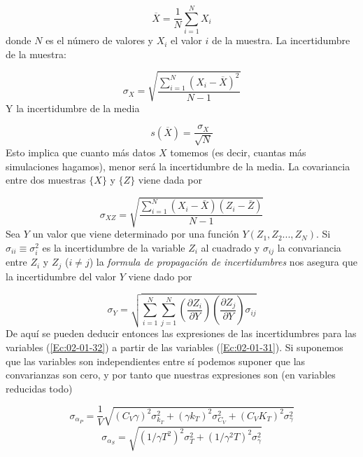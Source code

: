 \documentclass[11pt]{article} %
\newcommand{\parentesis}[1]{\left( #1  \right)}
\newcommand{\parciales}[2]{\frac{\partial #1}{\partial #2}}
\begin{document}
\begin{equation}
	 \overline{X} = \frac{1}{N}\sum_{i=1}^{N} X_i
\end{equation}
donde $N$ es el número de valores y $X_i$ el valor $i$ de la muestra. La incertidumbre de la muestra:

\begin{equation}
	\sigma_X = \sqrt{\frac{\sum_{i=1}^{N} \parentesis{X_i-\overline{X}}^2 }{N-1}}
\end{equation}
Y la incertidumbre de la media

\begin{equation}
	s(\overline{X}) = \frac{\sigma_X}{\sqrt{N}}
\end{equation}
Esto implica que cuanto más datos $X$ tomemos (es decir, cuantas más simulaciones hagamos), menor será la incertidumbre de la media. La covariancia entre dos muestras $\{ X \}$ y $\{ Z \}$ viene dada por 

\begin{equation}
	\sigma_{XZ} = \sqrt{ \frac{\sum_{i=1}^N (X_i-\bar{X})(Z_i-\bar{Z})}{N-1}}
\end{equation} 
Sea $Y$ un valor que viene determinado por una función $Y(Z_1,Z_2...,Z_N)$. Si $\sigma_{ii} \equiv \sigma_{i}^2$ es la incertidumbre de la variable $Z_i$ al cuadrado y $\sigma_{ij}$ la convariancia entre $Z_i$ y $Z_j$ ($i\neq j$) la \textit{formula de propagación de incertidumbres} nos asegura que la incertidumbre del valor $Y$ viene dado por

\begin{equation}
	\sigma_Y = \sqrt{\sum_{i=1}^N \sum_{j=1}^{N} \parentesis{\parciales{Z_i}{Y}}\parentesis{\parciales{Z_j}{Y}} \sigma_{ij} }
\end{equation} 
De aquí se pueden deducir entonces las expresiones de las incertidumbres para las variables (\ref{Ec:02-01-32}) a partir de las variables (\ref{Ec:02-01-31}). Si suponemos que las variables son independientes entre sí podemos suponer que las convarianzas son cero, y por tanto que nuestras expresiones son (en variables reducidas todo)

\begin{equation}
	\sigma_{\alpha_P} = \frac{1}{V} \sqrt{(C_V\gamma)^2 \sigma_{k_T}^2+ (\gamma k_T)^2 \sigma_{C_V}^2 + (C_V K_T)^2 \sigma_{\gamma}^2}
\end{equation}
\begin{equation}
	\sigma_{\alpha_S} =\sqrt{(1/\gamma T^2)^2 \sigma_{T}^2+ (1/\gamma^2 T)^2 \sigma_{\gamma}^2}
\end{equation}
\end{document}
